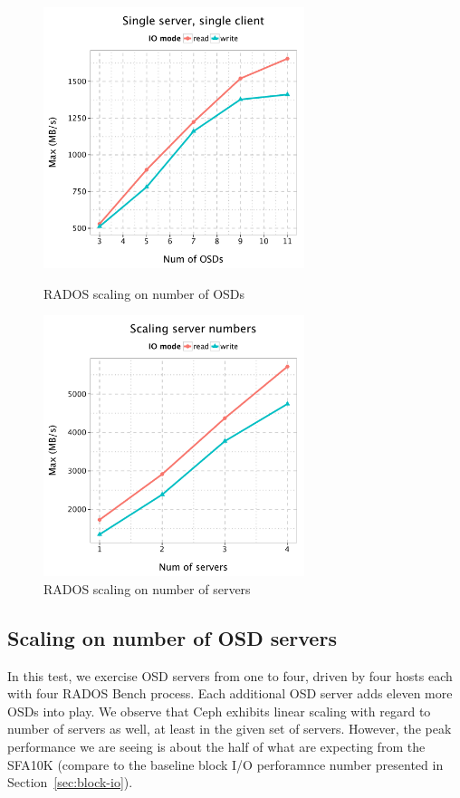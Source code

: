 \documentclass{article}
\begin{document}
\begin{figure}[H]
\centering
\begin{minipage}[t]{0.5\linewidth}
\centering
\includegraphics[width=3in]{data/rados_osd}
\caption{RADOS scaling on number of OSDs}
\label{fig:osd-scale}
\end{minipage}%
\begin{minipage}[t]{0.5\linewidth}
\centering
\includegraphics[width=3in]{data/rados_server}
\caption{RADOS scaling on number of servers}
\label{fig:oss-scale}
\end{minipage}%
\end{figure}

\subsection{Scaling on number of OSD servers}

In this test, we exercise OSD servers from one to four, driven by four hosts
each with four RADOS Bench process. Each additional OSD server
adds eleven more OSDs into play. We observe that Ceph exhibits linear scaling with
regard to number of servers as well, at least in the given set of servers.
However, the peak performance we are seeing is about the half of what are
expecting from the SFA10K (compare to the baseline block I/O perforamnce number
presented in Section~\ref{sec:block-io}).
\end{document}
